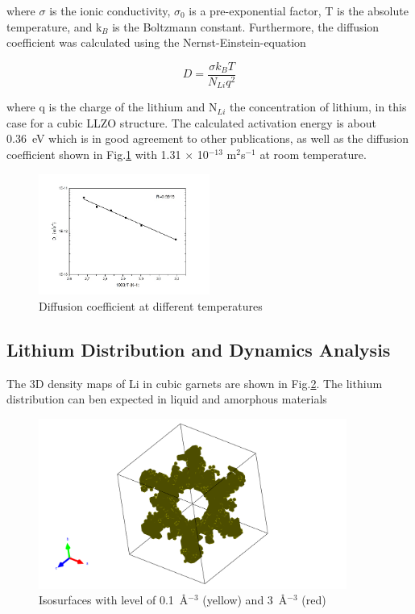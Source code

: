 \documentclass[twoside,twocolumn,9pt]{article}
\begin{document}
where $\sigma$ is the ionic conductivity, $\sigma_0$ is a pre-exponential factor, T is the absolute temperature, and k$_B$ is the Boltzmann constant. 
Furthermore, the diffusion coefficient was calculated using the Nernst-Einstein-equation

\begin{equation}
D=\frac{\sigma k_B T}{N_{Li} q^2}
\end{equation}

where q is the charge of the lithium and N$_{Li}$ the concentration of lithium, in this case for a cubic LLZO structure.
The calculated activation energy is about 0.36~eV which is in good agreement to other publications, 
as well as the diffusion coefficient shown in Fig.\ref{fig:DiffusionCoefficient} with 1.31 $\times$ 10$^{-13}$ m$^2$s$^{-1}$ at room temperature.  



\begin{figure}
\centering
\includegraphics[width=0.5\textwidth]{Pics/DiffusionCoefficient.png}
\caption{Diffusion coefficient at different temperatures}
\label{fig:DiffusionCoefficient}
\end{figure}


\subsection{Lithium Distribution and Dynamics Analysis}



The 3D density maps of Li in cubic garnets are shown in Fig.\ref{fig:pdfs}.
The lithium distribution can ben expected in liquid and amorphous materials

\begin{figure}
\centering
\includegraphics[width=0.9\textwidth]{Pics/pdfs.pdf}
\caption{Isosurfaces with level of 0.1~\AA$^{-3}$ (yellow) and 3~\AA$^{-3}$ (red)}
\label{fig:pdfs}
\end{figure}
\end{document}
